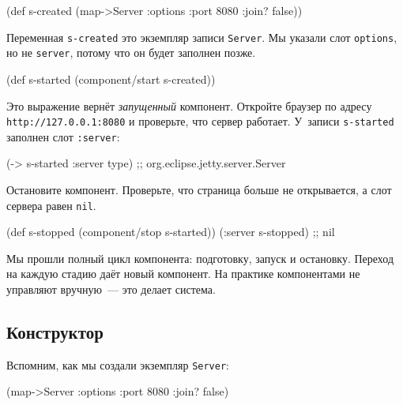 \begin{english}
  \begin{clojure}
(def s-created
  (map->Server {:options {:port 8080 :join? false}}))
  \end{clojure}
\end{english}

Переменная \verb|s-created| это экземпляр записи \verb|Server|. Мы указали
слот \verb|options|, но не \verb|server|, потому что он будет заполнен
позже.

\begin{english}
  \begin{clojure}
(def s-started (component/start s-created))
  \end{clojure}
\end{english}

Это выражение вернёт \emph{запущенный} компонент. Откройте браузер по адресу
\verb|http://127.0.0.1:8080| и проверьте, что сервер работает. У~записи
\verb|s-started| заполнен слот \verb|:server|:

\begin{english}
  \begin{clojure}
(-> s-started :server type)
;; org.eclipse.jetty.server.Server
  \end{clojure}
\end{english}

Остановите компонент. Проверьте, что страница больше не открывается, а слот
сервера равен \verb|nil|.

\begin{english}
  \begin{clojure}
(def s-stopped (component/stop s-started))
(:server s-stopped) ;; nil
  \end{clojure}
\end{english}

Мы прошли полный цикл компонента: подготовку, запуск и остановку. Переход на
каждую стадию даёт новый компонент. На практике компонентами не управляют
вручную~--- это делает система.

\subsection{Конструктор}


Вспомним, как мы создали экземпляр \verb|Server|:

\begin{english}
  \begin{clojure}
(map->Server {:options {:port 8080 :join? false}})
  \end{clojure}
\end{english}

